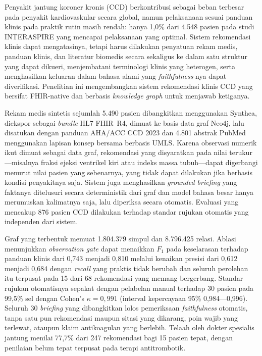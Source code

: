 \begin{singlespace}

\indent Penyakit jantung koroner kronis (CCD) berkontribusi sebagai beban terbesar pada penyakit
kardiovaskular secara global, namun pelaksanaan sesuai panduan klinis pada praktik rutin masih rendah:
hanya 1,0\% dari 4.548 pasien pada studi INTERASPIRE yang mencapai pelaksanaan yang optimal.
Sistem rekomendasi klinis dapat mengatasinya, tetapi harus dilakukan penyatuan rekam
medis, panduan klinis, dan literatur biomedis secara sekaligus ke dalam satu struktur yang dapat dikueri,
menjembatani terminologi klinis yang heterogen, serta menghasilkan keluaran dalam bahasa alami
yang \emph{faithfulness}-nya dapat diverifikasi. Penelitian ini mengembangkan sistem
rekomendasi klinis CCD yang bersifat FHIR-native dan berbasis \emph{knowledge graph}
untuk menjawab ketiganya.

Rekam medis sintetis sejumlah 5.490 pasien dibangkitkan menggunakan Synthea, diekspor sebagai
\emph{bundle} HL7 FHIR~R4, dimuat ke basis data graf Neo4j, lalu disatukan dengan panduan
AHA/ACC CCD 2023 dan 4.801 abstrak PubMed menggunakan lapisan konsep bersama berbasis UMLS. Karena
observasi numerik ikut dimuat sebagai data graf, rekomendasi yang disyaratkan pada nilai
terukur---misalnya fraksi ejeksi ventrikel kiri atau indeks massa tubuh---dapat digerbangi
menurut nilai pasien yang sebenarnya, yang tidak dapat dilakukan jika berbasis kondisi penyakitnya
saja. Sistem juga menghasilkan \emph{grounded briefing} yang faktanya ditelusuri secara
deterministik dari graf dan model bahasa besar hanya merumuskan kalimatnya saja, lalu
diperiksa secara otomatis. Evaluasi yang mencakup 876 pasien CCD dilakukan terhadap standar rujukan
otomatis yang independen dari sistem.

Graf yang terbentuk memuat 1.804.379 simpul dan 8.796.425 relasi. Ablasi menunjukkan
\emph{observation gate} dapat menaikkan $F_1$ pada keselarasan terhadap panduan klinis dari 0,743 menjadi 0,810 melalui
kenaikan presisi dari 0,612 menjadi 0,684 dengan \emph{recall} yang praktis tidak berubah dan
seluruh perolehan itu terpusat pada 15 dari 68 rekomendasi yang memang bergerbang. Standar
rujukan otomatisnya sepakat dengan pelabelan manual terhadap 30 pasien pada 99,5\% sel dengan
Cohen's $\kappa = 0{,}991$ (interval kepercayaan 95\% 0,984---0,996). Seluruh 30 \emph{briefing} yang dibangkitkan lolos pemeriksaan
\emph{faithfulness} otomatis, tanpa satu pun rekomendasi maupun sitasi yang dikarang, poin
wajib yang terlewat, ataupun klaim antikoagulan yang berlebih. Telaah oleh dokter spesialis
jantung menilai 77,7\% dari 247 rekomendasi bagi 15 pasien tepat, dengan penilaian belum
tepat terpusat pada terapi antitrombotik.


\end{singlespace}
